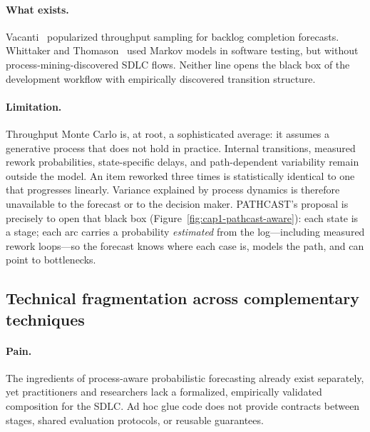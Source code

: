 

\paragraph{What exists.}
Vacanti~\cite{vacanti2015} popularized throughput sampling for backlog
completion forecasts.
Whittaker and Thomason~\cite{whittaker1994} used Markov models in
software testing, but without process-mining-discovered SDLC flows.
Neither line opens the black box of the development workflow with
empirically discovered transition structure.

\paragraph{Limitation.}
Throughput Monte Carlo is, at root, a sophisticated average: it assumes
a generative process that does not hold in practice.
Internal transitions, measured rework probabilities, state-specific
delays, and path-dependent variability remain outside the model.
An item reworked three times is statistically identical to one that
progresses linearly.
Variance explained by process dynamics is therefore unavailable to the
forecast or to the decision maker.
PATHCAST's proposal is precisely to open that black box
(Figure~\ref{fig:cap1-pathcast-aware}): each state is a stage; each arc
carries a probability \emph{estimated} from the log---including measured
rework loops---so the forecast knows where each case is, models the path,
and can point to bottlenecks.



\subsection{Technical fragmentation across complementary techniques}

\paragraph{Pain.}
The ingredients of process-aware probabilistic forecasting already exist
separately, yet practitioners and researchers lack a formalized,
empirically validated composition for the SDLC.
Ad hoc glue code does not provide contracts between stages, shared
evaluation protocols, or reusable guarantees.

